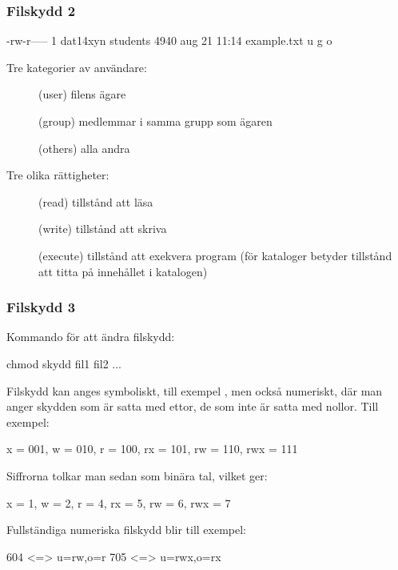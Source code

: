 \begin{frame}[fragile=singleslide]
    \frametitle{Filskydd 2}
    \begin{GobbleCode}{6}
        -rw-r-----  1 dat14xyn  students  4940 aug 21 11:14 example.txt
          u  g  o
    \end{GobbleCode}

    Tre kategorier av användare:

    \begin{description}
        \item[] (user) filens ägare
        \item[] (group) medlemmar i samma grupp som ägaren
        \item[] (others) alla andra
    \end{description}

    Tre olika rättigheter:

    \begin{description}
        \item[] (read) tillstånd att läsa
        \item[] (write) tillstånd att skriva
        \item[] (execute) tillstånd att exekvera program (för kataloger betyder  tillstånd att titta på innehållet i katalogen)
    \end{description}

\end{frame}

\begin{frame}[fragile=singleslide]
    \frametitle{Filskydd 3}
    Kommando för att ändra filskydd:

    \begin{Code}
        chmod skydd fil1 fil2 ...
    \end{Code}

    Filskydd kan anges symboliskt, till exempel , men också numeriskt, där man anger skydden som är satta med ettor, de som inte är satta med nollor. Till exempel:

    \begin{Code}
        x = 001, w = 010, r = 100, rx = 101, rw = 110, rwx = 111
    \end{Code}


    Siffrorna tolkar man sedan som binära tal, vilket ger:

    \begin{Code}
        x = 1, w = 2, r = 4, rx = 5, rw = 6, rwx = 7
    \end{Code}


    Fullständiga numeriska filskydd blir till exempel:

    \begin{Code}
        604 <=> u=rw,o=r    705 <=> u=rwx,o=rx
    \end{Code}
\end{frame}

